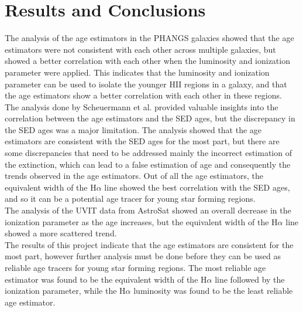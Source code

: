 \documentclass[12pt]{report}
\begin{document}
\chapter{Results and Conclusions}

The analysis of the age estimators in the PHANGS galaxies showed that the age estimators were not consistent with each other across multiple galaxies, but showed a better correlation with each other when the luminosity and ionization parameter were applied. This indicates that the luminosity and ionization parameter can be used to isolate the younger HII regions in a galaxy, and that the age estimators show a better correlation with each other in these regions.\\

The analysis done by Scheuermann et al. \cite{scheuermann2023stellar} provided valuable insights into the correlation between the age estimators and the SED ages, but the discrepancy in the SED ages was a major limitation. The analysis showed that the age estimators are consistent with the SED ages for the most part, but there are some discrepancies that need to be addressed mainly the incorrect estimation of the extinction, which can lead to a false estimation of age and consequently the trends observed in the age estimators. Out of all the age estimators, the equivalent width of the H$\alpha$ line showed the best correlation with the SED ages, and so it can be a potential age tracer for young star forming regions.\\

The analysis of the UVIT data from AstroSat showed an overall decrease in the ionization parameter as the age increases, but the equivalent width of the H$\alpha$ line showed a more scattered trend. \\

The results of this project indicate that the age estimators are consistent for the most part, however further analysis must be done before they can be used as reliable age tracers for young star forming regions. The most reliable age estimator was found to be the equivalent width of the H$\alpha$ line followed by the ionization parameter, while the H$\alpha$ luminosity was found to be the least reliable age estimator.















\end{document}

